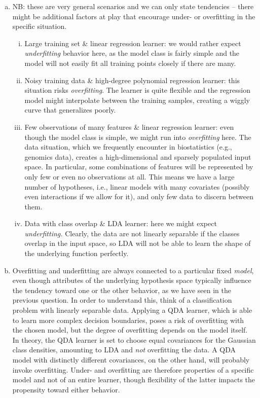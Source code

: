 \begin{enumerate}[a)]
  \item NB: these are very general scenarios and we can only state tendencies --
  there might be additional factors at play that encourage under- or overfitting 
  in the specific situation.
  \begin{enumerate}[i)]
    \item Large training set \& linear regression learner: we would rather 
    expect \textit{underfitting} behavior here, as the model class is fairly 
    simple and the model will not easily fit all training points closely if 
    there are many.
    \item Noisy training data \& high-degree polynomial regression learner: 
    this situation risks \textit{overfitting}. The learner is quite flexible and 
    the regression model might interpolate between the training samples, 
    creating a wiggly curve that generalizes poorly.
    \item Few observations of many features \& linear regression learner: even 
    though the model class is simple, we might run into \textit{overfitting} 
    here. The data situation, which we frequently encounter in biostatistics 
    (e.g., genomics data), creates a high-dimensional and sparsely populated 
    input space. In particular, some combinations of features will be 
    represented by only few or even no observations at all. 
    This means we have a large number of hypotheses, i.e., linear models with 
    many covariates (possibly even interactions if we allow for it), and 
    only few data to discern between them.
    \item Data with class overlap \& LDA learner: here we might expect 
    \textit{underfitting.} Clearly, the data are not linearly separable if the 
    classes overlap in the input space, so LDA will not be able to learn the 
    shape of the underlying function perfectly.
  \end{enumerate}
  \item Overfitting and underfitting are always connected to a 
  particular fixed \textit{model}, even though attributes of the underlying 
  hypothesis space typically influence the tendency toward one or the other 
  behavior, as we have seen in the previous question.
  In order to understand this, think of a classification problem with linearly 
  separable data.
  Applying a QDA learner, which is able to learn more complex decision 
  boundaries, poses a risk of overfitting with the chosen model, but the degree 
  of overfitting depends on the model itself.
  In theory, the QDA learner is set to choose equal covariances for the 
  Gaussian class densities, amounting to LDA and \textit{not} overfitting the 
  data.
  A QDA model with distinctly different covariances, on the other hand, will 
  probably invoke overfitting.
  Under- and overfitting are therefore properties of a specific model and not 
  of an entire learner, though flexibility of the latter impacts the 
  propensity toward either behavior.
  

\end{enumerate}
